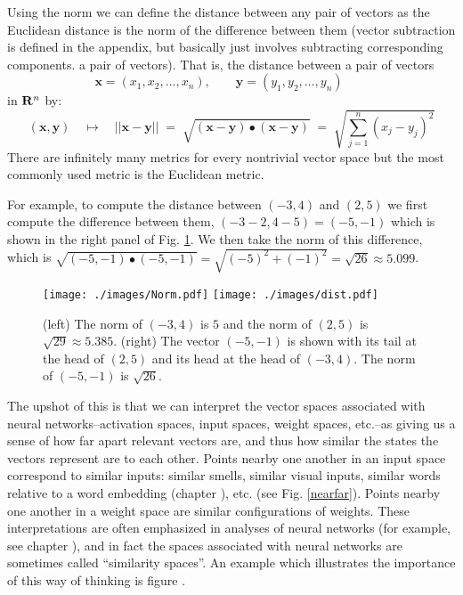 Using the norm we can define the distance between any pair of vectors as the Euclidean distance is the norm of the difference between them (vector subtraction is defined in the appendix, but basically just involves subtracting corresponding components. 
 a pair of vectors). That is, the distance between a pair of vectors
\begin{equation*}
\mathbf{x} = (x_1, x_2, \ldots, x_n), \qquad
\mathbf{y} = (y_1, y_2, \ldots, y_n) \qquad
\end{equation*}
in ${\bf R}^n$ by:
\begin{equation*}
\left(\mathbf{x}, \mathbf{y}\right) \quad \mapsto \quad
|| \mathbf{x} - \mathbf{y} || \; = \; 
\sqrt{ (\mathbf{x} - \mathbf{y}) \bullet (\mathbf{x} - \mathbf{y}) }
\; = \;  \sqrt{ \sum_{j=1}^n (x_j - y_j)^2 }
\end{equation*}
There are infinitely many metrics for every nontrivial vector space but the 
most commonly used metric is the Euclidean metric.

For example, to compute the distance between $(-3,4)$ and $(2,5)$ we first compute the difference between them, 
$(-3 -2,  4- 5) = (-5,-1)$ which is shown in the right 
panel of Fig. \ref{metricfig}. We then take the norm of this difference, which is $ \sqrt{ (-5,-1) \bullet  (-5,-1)}  = \sqrt{(-5)^2+(-1)^2} 
= \sqrt{26} \approx 5.099$.

\begin{figure}[h]
\centering
\texttt{[image: ./images/Norm.pdf]}
\qquad
\texttt{[image: ./images/dist.pdf]}
\caption{(left) The norm of $(-3,4)$ is $5$ and the norm of $(2,5)$ is 
$\sqrt{29} \approx 5.385$. (right) The vector $(-5,-1)$ is shown with its tail at the head 
of $(2,5)$ and its head at the head of $(-3,4)$. The norm of $(-5,-1)$ is 
$\sqrt{26}$.}
\label{metricfig}
\end{figure}

   The upshot of this is that we can interpret the vector spaces associated 
with neural networks--activation spaces, input spaces, weight spaces, etc.--as 
giving us a sense of how far apart relevant vectors are, and thus how similar 
the states the vectors represent are to each other. Points nearby one another 
in an input space correspond to similar inputs: similar smells, similar visual 
inputs, similar words relative to a word embedding (chapter 
), etc. (see Fig. \ref{nearfar}). Points nearby one 
another in a weight space are similar configurations of weights. These 
interpretations are often emphasized in analyses of neural networks (for 
example, see chapter ), and in fact the spaces 
associated with neural networks are sometimes called ``similarity spaces''. An 
example which illustrates the importance of this way of thinking is figure 
.


